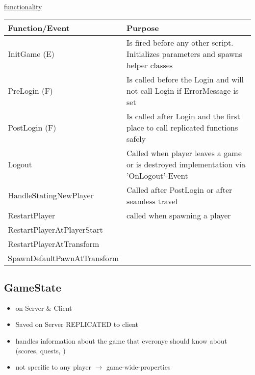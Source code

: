 \documentclass{scrbook}
\begin{document}
                \underline{functionality}
                \begin{table}[H]
                    \begin{tabular}{|p{6cm}|p{12cm}|}
                        \hline
                            Function/Event & Purpose \\
                        \hline
                            InitGame (E) & Is fired before any other script. Initializes parameters and spawns helper classes \\
                            PreLogin (F) & Is called before the Login and will not call Login if ErrorMessage is set \\
                            PostLogin (F) & Is called after Login and the first place to call replicated functions safely \\
                            Logout & Called when player leaves a game or is destroyed implementation via 'OnLogout'-Event \\
                            HandleStatingNewPlayer & Called after PostLogin or after seamless travel \\
                            RestartPlayer & called when spawning a player \\
                            RestartPlayerAtPlayerStart &  \\
                            RestartPlayerAtTransform &  \\
                            SpawnDefaultPawnAtTransform &  \\
                        \hline
                    \end{tabular}
                \end{table}

            \subsection{GameState}
                \begin{itemize}
                    \item on Server \& Client
                    \item Saved on Server REPLICATED to client
                    \item handles information about the game that everonye should know about (scores, quests, ) 
                    \item not specific to any player $\rightarrow$ game-wide-properties
                \end{itemize}
\end{document}
